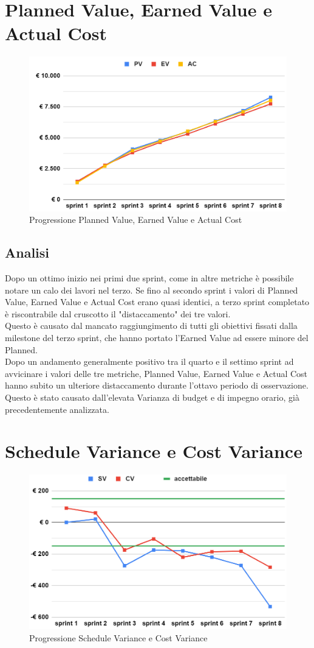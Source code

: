 \section{Planned Value, Earned Value e Actual Cost}
\begin{figure}[H]
    \centering
    \includegraphics[width=0.8\linewidth]{PVEVAC.png}
    \caption{Progressione Planned Value, Earned Value e Actual Cost}
\end{figure}
\subsection{Analisi}
Dopo un ottimo inizio nei primi due sprint, come in altre metriche è possibile notare un calo dei lavori nel terzo. Se fino al secondo sprint i valori di Planned Value, Earned Value e Actual Cost erano quasi identici, a terzo sprint completato è riscontrabile dal cruscotto il "distaccamento" dei tre valori.\\
Questo è causato dal mancato raggiungimento di tutti gli obiettivi fissati dalla milestone del terzo sprint, che hanno portato l'Earned Value ad essere minore del Planned.\\
Dopo un andamento generalmente positivo tra il quarto e il settimo sprint ad avvicinare i valori delle tre metriche, Planned Value, Earned Value e Actual Cost hanno subito un ulteriore distaccamento durante l'ottavo periodo di osservazione. Questo è stato causato dall'elevata Varianza di budget e di impegno orario, già precedentemente analizzata.

\section{Schedule Variance e Cost Variance}
\begin{figure}[H]
    \centering
    \includegraphics[width=0.8\linewidth]{SVCV.png}
    \caption{Progressione Schedule Variance e Cost Variance}
\end{figure}
